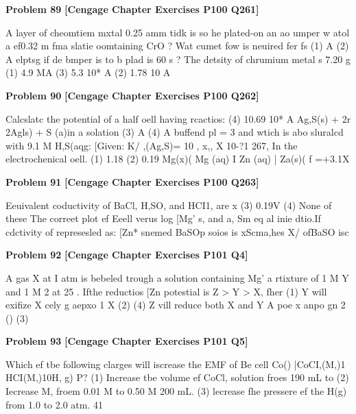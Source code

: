 \begin{problembox}
\textbf{Problem 89} \hfill \textbf{[Cengage Chapter Exercises P100 Q261]}
\label{q:ext-cng-th-89}

A layer of cheomtiem mxtal 0.25 amm tidk is so he plated-on
an ao umper w atol a ef0.32 m fma slatie
oomtaining CrO ? Wat cumet fow is neuired fer fs
(1) A
(2) A
elptsg if de bmper is to b plad is 60 s ? The
detsity of chrumium metal s 7.20 g 
(1) 4.9   MA
(3) 5.3   10* A
(2) 1.78   10  A
\end{problembox}

\begin{problembox}
\textbf{Problem 90} \hfill \textbf{[Cengage Chapter Exercises P100 Q262]}
\label{q:ext-cng-th-90}

Calcslatc the potential of a half oell having rcactios:
(4) 10.69   10* A
Ag,S(s) + 2r  2Agls) + S (a)in a solation
(3) A
(4) A
buffend  pl = 3 and wtich is abo sluralcd with 9.1 M
H,S(aqg:
[Given: K/ ,(Ag,S)= 10 , x,, X
 10-?1
267, In the electrochenical oell.
(1) 1.18
(2) 0.19
Mg(x)( Mg (aq) I Zn (aq) | Za(s)(
f =+3.1X
\end{problembox}

\begin{problembox}
\textbf{Problem 91} \hfill \textbf{[Cengage Chapter Exercises P100 Q263]}
\label{q:ext-cng-th-91}

Eeuivalent coductivity of BaCl, H,SO, and HCI1, are x
(3) 0.19V
(4) None of these
The correet plot ef Eeell verus log
[Mg'
s, and a, Sm eq al inie dtio.If cdctivity of
represesled as:
[Zn*
snemed BaSOp soios is xScma,hes X/ ofBaSO isc
\end{problembox}

\begin{problembox}
\textbf{Problem 92} \hfill \textbf{[Cengage Chapter Exercises P101 Q4]}
\label{q:ext-cng-th-92}

A gas X at I atm is bebeled trough a solution containing
Mg'
a rtixture of 1 M Y and 1 M 2  at 25 . Ifthe reductios
[Zn
potestial is Z > Y > X, fher
(1) Y will exifize X cely
g aepxo 1 X (2)
(4) Z vill reduce both X and Y
A poe x anpo gn 2 ()
(3)
\end{problembox}

\begin{problembox}
\textbf{Problem 93} \hfill \textbf{[Cengage Chapter Exercises P101 Q5]}
\label{q:ext-cng-th-93}

Which ef tbe following clarges will iscrease the EMF of
Be cell
Co() |CoCI,(M,)1 HCI(M,)10H, g) P?
(1) Increase tbe volume ef CoCl, solution froes 190 mL to
(2) Iecrease M, froem 0.01 M to 0.50 M
200 mL.
(3) lecrease fhe pressere ef the H(g) from 1.0 to 2.0 atm.
41
\end{problembox}

